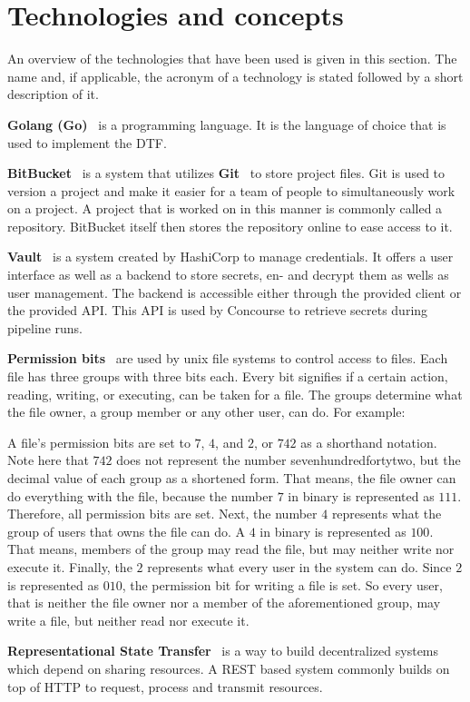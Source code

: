 \chapter{Technologies and concepts}\label{ch:technologies-used}

An overview of the technologies that have been used is given in this section.
The name and, if applicable, the acronym of a technology is stated followed by a short description of it.

\textbf{Golang (Go)}~\cite{golang} is a programming language.
It is the language of choice that is used to implement the DTF.

\textbf{BitBucket}~\cite{bitbucket} is a system that utilizes \textbf{Git}~\cite{git} to store project files.
Git is used to version a project and make it easier for a team of people to simultaneously work on a project.
A project that is worked on in this manner is commonly called a repository.
BitBucket itself then stores the repository online to ease access to it.

\textbf{Vault}~\cite{vault} is a system created by HashiCorp to manage credentials.
It offers a user interface as well as a backend to store secrets, en- and decrypt them as wells as user management.
The backend is accessible either through the provided client or the provided API.
This API is used by Concourse to retrieve secrets during pipeline runs.

\textbf{Permission bits}~\cite{unix-file-permissions} are used by unix file systems to control access to files.
Each file has three groups with three bits each.
Every bit signifies if a certain action, reading, writing, or executing, can be taken for a file.
The groups determine what the file owner, a group member or any other user, can do.
For example:

A file's permission bits are set to $7$, $4$, and $2$, or $742$ as a shorthand notation.
Note here that $742$ does not represent the number sevenhundredfortytwo, but the decimal value of each group as a shortened form.
That means, the file owner can do everything with the file, because the number $7$ in binary is represented as $111$.
Therefore, all permission bits are set.
Next, the number $4$ represents what the group of users that owns the file can do.
A $4$ in binary is represented as $100$.
That means, members of the group may read the file, but may neither write nor execute it.
Finally, the $2$ represents what every user in the system can do.
Since $2$ is represented as $010$, the permission bit for writing a file is set.
So every user, that is neither the file owner nor a member of the aforementioned group, may write a file, but neither read nor execute it.

\textbf{Representational State Transfer}~\cite{extending-representation-state-transfer} is a way to build decentralized systems which depend on sharing resources.
A REST based system commonly builds on top of HTTP to request, process and transmit resources.
